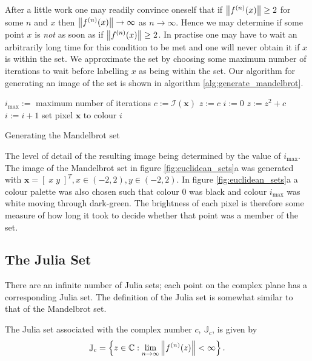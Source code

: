 After a little work one may readily convince oneself that if $\left\Vert f^{(n)}(x) \right\Vert \ge 2$
for some $n$ and $x$ then $\left\Vert f^{(n)}(x) \right\Vert \rightarrow \infty$ as $n \rightarrow \infty$.
Hence we may determine if some point $x$ is \emph{not} as soon as if $\left\Vert f^{(n)}(x) \right\Vert \ge 2$. 
In practise one may have to wait an arbitrarily long time for this condition to be met
and one will never obtain it if $x$ is within the set. We approximate the
set by choosing some maximum number of iterations to wait before labelling
$x$ as being within the set.
Our algorithm for generating an image of the
set is shown in algorithm \ref{alg:generate_mandelbrot}.

\begin{fancyalg}
\begin{algorithmic}[1]
\STATE $i_{\mathrm{max}} :=$ maximum number of iterations
\STATE $c := {\mathcal I}(\mathbf{x})$
\STATE $z := c$
\STATE $i := 0$
  \STATE $z := z^2 + c$
  \STATE $i := i+1$
\ENDWHILE 
\STATE set pixel $\mathbf{x}$ to colour $i$
\ENDFOR
\end{algorithmic}
\caption{
\label{alg:generate_mandelbrot}
  Generating the Mandelbrot set}
\end{fancyalg}

The level of detail of the resulting image being determined by the value of $i_{\mathrm{max}}$.
The image of the Mandelbrot set in figure \ref{fig:euclidean_sets}a was
generated with $\mathbf{x} = [\;x\;y\;]^T, x \in (-2,2), y \in (-2,2)$.
In figure \ref{fig:euclidean_sets}a a colour palette was also chosen such that colour 0 was black
and colour $i_{\mathrm{max}}$ was white moving through dark-green. The brightness of
each pixel is therefore some measure of how long it took to decide whether that point was
a member of the set.

\subsection{The Julia Set}

There are an infinite number of Julia sets; each point on the complex plane
has a corresponding Julia set. The definition of the Julia set is somewhat
similar to that of the Mandelbrot set.

\begin{definition}
The Julia set associated
with the complex number $c$, $\mathbb{J}_c$, is given by
\[
\mathbb{J}_c = 
\left\{z \in \mathbb{C}
: \lim_{n \rightarrow \infty} \left\Vert f^{(n)}(z) \right\Vert < \infty \right\}.
\]
\end{definition}

